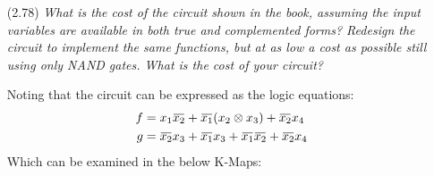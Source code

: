 \documentclass[12pt]{article}
\newcommand{\overbar}[1]{\mkern 1.5mu\overline{\mkern-1.5mu#1\mkern-1.5mu}\mkern 1.5mu}
\begin{document}
\begin{enumerate}
\begin{enumerate}
\begin{center}
	      	      \end{center}

	      	      \newpage
	      	\item[(2.78)] \textit{What is the cost of the circuit shown in the book, assuming the input variables are available in both true and complemented forms? Redesign the circuit to implement the same functions, but at as low a cost as possible still using only NAND gates. What is the cost of your circuit?}

	      	      Noting that the circuit can be expressed as the logic equations:
	      	      \begin{align*}
	      	      	f & = x_1\overbar{x_2} + \overbar{x_1}(x_2 \otimes x_3) + \overbar{x_2}x_4                \\
	      	      	g & = \overbar{x_2}x_3 + \overbar{x_1}x_3 + \overbar{x_1}\overbar{x_2} + \overbar{x_2}x_4
	      	      \end{align*}
	      	      Which can be examined in the below K-Maps:


\end{enumerate}
\end{enumerate}
\end{document}
